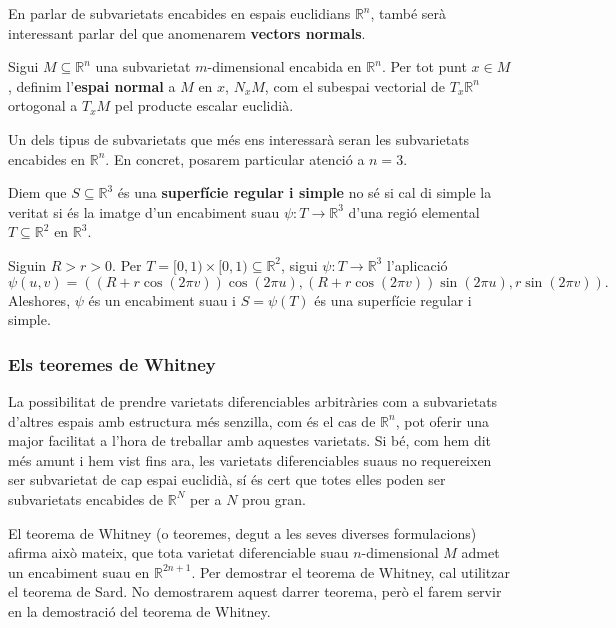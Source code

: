 En parlar de subvarietats encabides en espais euclidians $\mathbb R^n$, també serà interessant parlar del que anomenarem \textbf{vectors normals}.
\begin{defi}\label{def:espai_normal}
    Sigui $M\subseteq\mathbb R^n$ una subvarietat $m$-dimensional encabida en $\mathbb R^n$. Per tot punt $x\in M$, definim l'\textbf{espai normal} a $M$ en $x$, $N_xM$, com el subespai vectorial de $T_x\mathbb R^n$ ortogonal a $T_xM$ pel producte escalar euclidià.
\end{defi}

Un dels tipus de subvarietats que més ens interessarà seran les subvarietats encabides en $\mathbb R^n$. En concret, posarem particular atenció a $n=3$.

\begin{defi}
    Diem que $S\subseteq\mathbb R^3$ és una \textbf{superfície regular i simple} {\color{blue} no sé si cal di simple la veritat} si és la imatge d'un encabiment suau $\psi:T\to\mathbb R^3$ d'una regió elemental $T\subseteq\mathbb R^2$ en $\mathbb R^3$.
\end{defi}

\begin{ex}
    Siguin $R>r>0$. Per $T = [0,1)\times[0,1)\subseteq\mathbb R^2$, sigui $\psi:T\to\mathbb R^3$ l'aplicació
    \begin{equation*}
        \psi(u,v) = \left( (R+r\cos(2\pi v))\cos(2\pi u), (R+r\cos(2\pi v))\sin(2\pi u), r\sin(2\pi v) \right).
    \end{equation*}
    Aleshores, $\psi$ és un encabiment suau i $S = \psi(T)$ és una superfície regular i simple.
\end{ex}

\subsubsection{Els teoremes de Whitney}
La possibilitat de prendre varietats diferenciables arbitràries com a subvarietats d'altres espais amb estructura més senzilla, com és el cas de $\mathbb R^n$, pot oferir una major facilitat a l'hora de treballar amb aquestes varietats. Si bé, com hem dit més amunt i hem vist fins ara, les varietats diferenciables suaus no requereixen ser subvarietat de cap espai euclidià, sí és cert que totes elles poden ser subvarietats encabides de $\mathbb R^N$ per a $N$ prou gran.

El teorema de Whitney (o teoremes, degut a les seves diverses formulacions) afirma això mateix, que tota varietat diferenciable suau $n$-dimensional $M$ admet un encabiment suau en $\mathbb R^{2n+1}$. Per demostrar el teorema de Whitney, cal utilitzar el teorema de Sard. No demostrarem aquest darrer teorema, però el farem servir en la demostració del teorema de Whitney.

